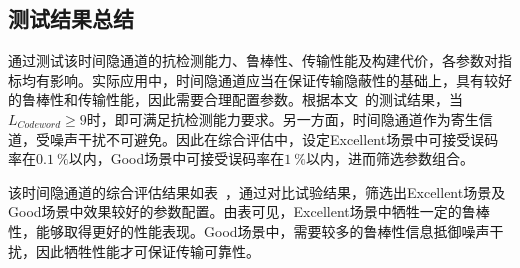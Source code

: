 \subsection{测试结果总结}
\label{chap:hash:result:evaluation}

通过测试该时间隐通道的抗检测能力、鲁棒性、传输性能及构建代价，各参数对指标均有影响。实际应用中，时间隐通道应当在保证传输隐蔽性的基础上，具有较好的鲁棒性和传输性能，因此需要合理配置参数。根据本文\ 的测试结果，当$L_{Codeword}\ge 9$时，即可满足抗检测能力要求。另一方面，时间隐通道作为寄生信道，受噪声干扰不可避免。因此在综合评估中，设定Excellent场景中可接受误码率在{$0.1\ \%$}以内，Good场景中可接受误码率在{$1\ \%$}以内，进而筛选参数组合。


该时间隐通道的综合评估结果如表\ ，通过对比试验结果，筛选出Excellent场景及Good场景中效果较好的参数配置。由表可见，Excellent场景中牺牲一定的鲁棒性，能够取得更好的性能表现。Good场景中，需要较多的鲁棒性信息抵御噪声干扰，因此牺牲性能才可保证传输可靠性。

